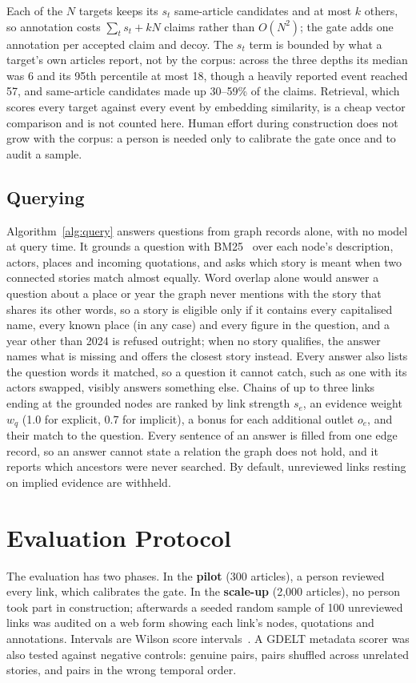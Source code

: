 \documentclass[conference]{IEEEtran}
\begin{document}
Each of the $N$ targets keeps its $s_t$ same-article candidates and at most $k$ others, so
annotation costs $\sum_t s_t + kN$ claims rather than $O(N^2)$; the gate adds one annotation per
accepted claim and decoy. The $s_t$ term is bounded by what a target's own articles report, not by
the corpus: across the three depths its median was 6 and its 95th percentile at most 18, though a
heavily reported event reached 57, and same-article candidates made up 30--59\% of the claims.
Retrieval, which scores every target against every event by embedding similarity, is a cheap vector
comparison and is not counted here. Human effort during construction does not grow with the corpus:
a person is needed only to calibrate the gate once and to audit a sample.

\subsection{Querying}
Algorithm~\ref{alg:query} answers questions from graph records alone, with no model at query time.
It grounds a question with BM25~\cite{bm25} over each node's description, actors, places and
incoming quotations, and asks which story is meant when two connected stories match almost equally.
Word overlap alone would answer a question about a place or year the graph never mentions with the
story that shares its other words, so a story is eligible only if it contains every capitalised name,
every known place (in any case) and every figure in the question, and a year other than 2024 is
refused outright; when no story qualifies, the answer names what is missing and offers the closest
story instead. Every answer also lists the question words it matched, so a question it cannot catch,
such as one with its actors swapped, visibly answers something else.
Chains of up to three links ending at the grounded nodes are ranked by link strength $s_e$, an
evidence weight $w_q$ (1.0 for explicit, 0.7 for implicit), a bonus for each additional outlet
$o_e$, and their match to the question. Every sentence of an answer is filled from one edge record,
so an answer cannot state a relation the graph does not hold, and it reports which ancestors were
never searched. By default, unreviewed links resting on implied evidence are withheld.

\section{Evaluation Protocol}
The evaluation has two phases. In the \textbf{pilot} (300 articles), a person reviewed every link,
which calibrates the gate. In the \textbf{scale-up} (2{,}000 articles), no person took part in
construction; afterwards a seeded random sample of 100 unreviewed links was audited on a web form
showing each link's nodes, quotations and annotations. Intervals are Wilson score
intervals~\cite{wilson}. A GDELT metadata scorer was also tested against negative controls: genuine
pairs, pairs shuffled across unrelated stories, and pairs in the wrong temporal order.
\end{document}
